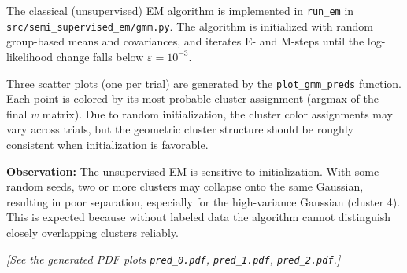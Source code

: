 \begin{answer}
The classical (unsupervised) EM algorithm is implemented in \texttt{run\_em} in \texttt{src/semi\_supervised\_em/gmm.py}. The algorithm is initialized with random group-based means and covariances, and iterates E- and M-steps until the log-likelihood change falls below $\varepsilon = 10^{-3}$.

Three scatter plots (one per trial) are generated by the \texttt{plot\_gmm\_preds} function. Each point is colored by its most probable cluster assignment (argmax of the final $w$ matrix). Due to random initialization, the cluster color assignments may vary across trials, but the geometric cluster structure should be roughly consistent when initialization is favorable.

\textbf{Observation:} The unsupervised EM is sensitive to initialization. With some random seeds, two or more clusters may collapse onto the same Gaussian, resulting in poor separation, especially for the high-variance Gaussian (cluster 4). This is expected because without labeled data the algorithm cannot distinguish closely overlapping clusters reliably.

\textit{[See the generated PDF plots \texttt{pred\_0.pdf}, \texttt{pred\_1.pdf}, \texttt{pred\_2.pdf}.]}
\end{answer}
